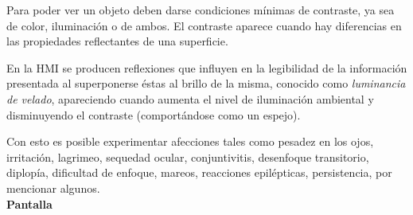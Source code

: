 Para poder ver un objeto deben darse condiciones mínimas de contraste, ya sea de color, iluminación o de ambos. El contraste aparece cuando hay diferencias en las propiedades reflectantes de una superficie.

En la HMI se producen reflexiones que influyen en la legibilidad de la información presentada al superponerse éstas al brillo de la misma, conocido como \textit{luminancia de velado}, apareciendo cuando aumenta el nivel de iluminación ambiental y disminuyendo el contraste (comportándose como un espejo).

Con esto es posible experimentar afecciones tales como pesadez en los ojos, irritación, lagrimeo, sequedad ocular, conjuntivitis, desenfoque transitorio, diplopía, dificultad de enfoque, mareos, reacciones epilépticas, persistencia, por mencionar algunos.\\

\textbf{Pantalla}

